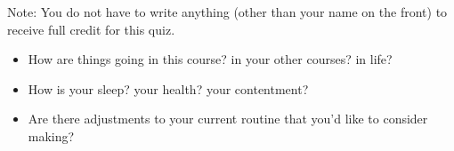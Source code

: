 %
%

\noindent{}Note: You do not have to write anything (other than your name on the front) to receive full credit for this quiz.

\begin{itemize}
\item How are things going in this course? in your other courses? in life?
\item How is your sleep? your health? your contentment?
\item Are there adjustments to your current routine that you'd like to consider making?
\end{itemize}